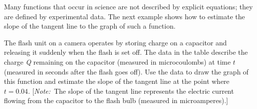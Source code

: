 \documentclass{sebase}
\begin{document}
Many functions that occur in
science are not described by explicit equations; they are defined by
experimental data. The next example shows how to estimate the slope of the
tangent line to the graph of such a function.

\begin{Example}[2]
\VIDEO%
%
The flash unit on a camera operates by storing charge on a capacitor and
releasing it suddenly when the flash is set off. The data in the table
describe the charge \textit{Q} remaining on the capacitor (measured in
microcoulombs) at time $t$ (measured in seconds after the flash goes off).
Use the data to draw the graph of this function and estimate the slope of
the tangent%
 line at the point where $t=0.04$. [\textit{Note:\ }The slope of the
tangent line represents the electric current flowing from the capacitor to
the flash bulb (measured in microamperes).]
\end{Example}
\end{document}
